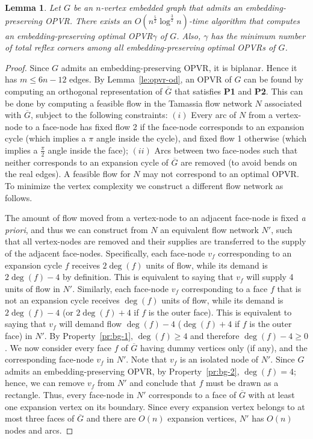\documentclass{article}
\newtheorem{lemma}{Lemma}
\newcommand{\p}{\pi}
\newcommand{\ph}{\frac{\pi}{2}}
\newcommand{\opvr}{OPVR\xspace}
\newcommand{\bG}{\overline{G}}
\begin{document}
\begin{lemma}\label{le:opt}
Let $G$ be an $n$-vertex embedded graph that admits an embedding-preserving \opvr. There exists an $O(n^{\frac{5}{2}}\log^{\frac{3}{2}} n)$-time algorithm that computes an embedding-preserving optimal \opvr $\gamma$ of $G$. Also, $\gamma$ has the minimum number of total reflex corners among all embedding-preserving optimal {\opvr}s of $G$.
\end{lemma}
\begin{proof}
Since $G$ admits an embedding-preserving \opvr, it is biplanar. Hence it has $m \leq 6n - 12$ edges.
By Lemma~\ref{le:opvr-od}, an \opvr of $G$ can be found by computing an orthogonal representation of $\bG$ that satisfies {\bf P1} and {\bf P2}. This can be done by computing a feasible flow in the Tamassia flow network $N$ associated with $\bG$, subject to the following constraints: $(i)$ Every arc of $N$ from a vertex-node to a face-node has fixed flow 2 if the face-node corresponds to an expansion cycle (which implies a $\p$ angle inside the cycle), and fixed flow 1 otherwise (which implies a $\ph$ angle inside the face); $(ii)$ Arcs between two face-nodes such that neither corresponds to an expansion cycle of $\bG$ are removed (to avoid bends on the real edges). A feasible flow for $N$ may not correspond to an optimal \opvr. To minimize the vertex complexity we construct a different flow network as follows. 

The amount of flow moved from a vertex-node to an adjacent face-node is fixed \emph{a priori}, and thus we can construct from $N$ an equivalent flow network $N'$, such that all vertex-nodes are removed and their supplies are transferred to the supply of the adjacent face-nodes. Specifically, each face-node $v_f$ corresponding to an expansion cycle $f$ receives $2\deg(f)$ units of flow, while its demand is $2\deg(f)-4$ by definition. This is equivalent to saying that $v_f$ will supply 4 units of flow in $N'$. Similarly, each face-node $v_f$ corresponding to a face $f$ that is not an expansion cycle receives $\deg(f)$ units of flow, while its demand is $2\deg(f)-4$ (or $2\deg(f)+4$ if $f$ is the outer face). This is equivalent to saying that $v_f$ will demand flow $\deg(f)-4$ ($\deg(f)+4$ if $f$ is the outer face) in $N'$. By Property~\ref{pr:bg-1}, $\deg(f) \geq 4$ and therefore $\deg(f)-4 \geq 0$. We now consider every face $f$ of $\bG$ having dummy vertices only (if any), and the corresponding face-node $v_f$ in $N'$. Note that $v_f$ is an isolated node of $N'$. Since $G$ admits an embedding-preserving \opvr, by Property~\ref{pr:bg-2},  $\deg(f) = 4$; hence, we can remove $v_f$ from $N'$ and conclude that $f$ must be drawn as a rectangle. Thus, every face-node in $N'$ corresponds to a face of $\bG$ with at least one expansion vertex on its boundary. Since every expansion vertex belongs to at most three faces of $\bG$ and there are $O(n)$ expansion vertices, $N'$ has $O(n)$ nodes and arcs.  


\end{proof}
\end{document}
